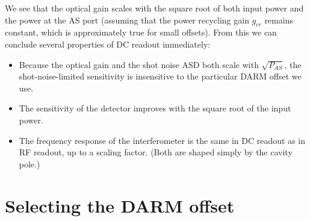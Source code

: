 We see that the optical gain scales with the square root of both input
power and the power at the AS port (assuming that the power recycling
gain $g_{cr}$ remains constant, which is approximately true for small
offsets).  From this we can conclude several properties of DC readout
immediately:
%
\begin{itemize}
\item Because the optical gain and the shot noise ASD both scale with
  $\sqrt{P_{AS}}$, the shot-noise-limited sensitivity is insensitive to the
  particular DARM offset we use.
\item The sensitivity of the detector improves with the square root of
  the input power.
\item The frequency response of the interferometer is the same in DC
  readout as in RF readout, up to a scaling factor. (Both are shaped
  simply by the cavity pole.)
\end{itemize}

\section{Selecting the DARM offset}


